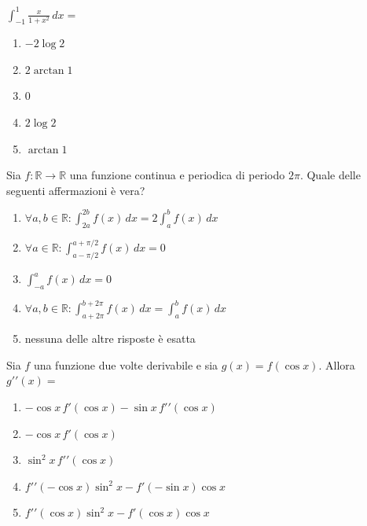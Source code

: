\begin{quiz}
$\displaystyle\int_{-1}^{1}\frac{x}{1+x^2}\,dx=$
\begin{enumerate}
\item $-2\log2$
\item $2\arctan1$
\item $0$
\item $2\log2$
\item $\arctan1$
\end{enumerate}
\end{quiz}

\begin{quiz}
Sia $f:\mathbb R\to\mathbb R$ una funzione continua e periodica di periodo $2\pi$. Quale delle seguenti affermazioni \`e vera?
\begin{enumerate}
\item $\forall a,b\in\mathbb R:\int_{2a}^{2b}f(x)\,dx=2\int_a^bf(x)\,dx$
\item $\forall a\in\mathbb R:\int_{a-\pi/2}^{a+\pi/2}f(x)\,dx=0$
\item $\int_{-a}^af(x)\,dx=0$
\item $\forall a,b\in\mathbb R:\int_{a+2\pi}^{b+2\pi}f(x)\,dx=\int_a^bf(x)\,dx$
\item nessuna delle altre risposte \`e esatta
\end{enumerate}
\end{quiz}

\begin{quiz}
Sia $f$ una funzione due volte derivabile e sia $g(x)=f(\cos x)$. Allora $g\prime\prime(x)=$
\begin{enumerate}
\item $-\cos x\,f\prime(\cos x)-\sin x\,f\prime\prime(\cos x)$
\item $-\cos x\,f\prime(\cos x)$
\item $\sin^2x\,f\prime\prime(\cos x)$
\item $f\prime\prime(-\cos x)\sin^2x-f\prime(-\sin x)\cos x$
\item $f\prime\prime(\cos x)\sin^2x-f\prime(\cos x)\cos x$
\end{enumerate}
\end{quiz}

